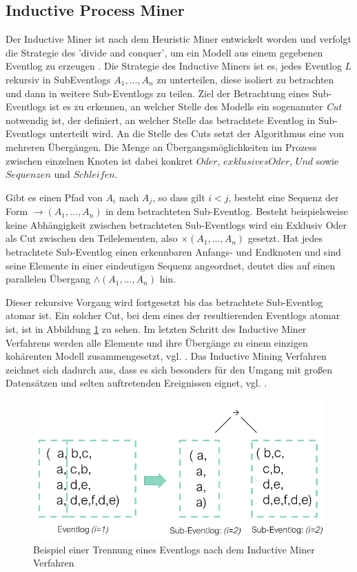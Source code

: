 \subsection{Inductive Process Miner}\label{sec:inducMiner}
Der Inductive Miner ist nach dem Heuristic Miner entwickelt worden und verfolgt die Strategie des 'divide and conquer', um ein Modell aus einem gegebenen Eventlog zu erzeugen \cite{inducMining}. 
Die Strategie des Inductive Miners ist es, jedes Eventlog $L$ rekursiv in SubEventlogs $A_1 , ... , A_n$ zu unterteilen, diese isoliert zu betrachten und dann in weitere Sub-Eventlogs zu teilen. 
Ziel der Betrachtung eines Sub-Eventlogs ist es zu erkennen, an welcher Stelle des Modells ein sogenannter \textit{Cut} notwendig ist, der definiert, an welcher Stelle das betrachtete Eventlog in Sub-Eventlogs unterteilt wird. An die Stelle des Cuts setzt der Algorithmus eine von mehreren Übergängen. Die Menge an Übergangsmöglichkeiten im Prozess zwischen einzelnen Knoten ist dabei konkret $Oder$, $exklusives  Oder$, $Und$ sowie $Sequenzen$ und $Schleifen$. 

\newpage
Gibt es einen Pfad von $A_i$ nach $A_j$, so dass gilt $ i < j $, besteht eine Sequenz der Form $ → (A_1 , ... , A_n)$ in dem betrachteten Sub-Eventlog.
Besteht beispielsweise keine Abhängigkeit zwischen betrachteten Sub-Eventlogs wird ein Exklusiv Oder als Cut zwischen den Teilelementen, also $ × (A_1 , ... , A_n)$ gesetzt. 
Hat jedes betrachtete Sub-Eventlog einen erkennbaren Anfangs- und Endknoten und sind seine Elemente in einer eindeutigen Sequenz angeordnet, deutet dies auf einen parallelen Übergang $ ∧ (A_1 , ... , A_n)$ hin. 

Dieser rekursive Vorgang wird fortgesetzt bis das betrachtete Sub-Eventlog atomar ist. Ein solcher Cut, bei dem eines der resultierenden Eventlogs atomar ist, ist in Abbildung \ref{fig:imExample} zu sehen. Im letzten Schritt des Inductive Miner Verfahrens werden alle Elemente und ihre Übergänge zu einem einzigen kohärenten Modell zusammengesetzt, vgl. \cite{inducMining}. Das Inductive Mining Verfahren zeichnet sich dadurch aus, dass es sich besonders für den Umgang mit großen Datensätzen und selten auftretenden Ereignissen eignet, vgl. \cite{minerEval}.

\begin{figure}[!h]
    \centering
    \includegraphics[scale=0.5]{figures/Appbildungen/im_example.PNG}
    \caption{Beispiel einer Trennung eines Eventlogs nach dem Inductive Miner Verfahren}
    \label{fig:imExample}
\end{figure}


